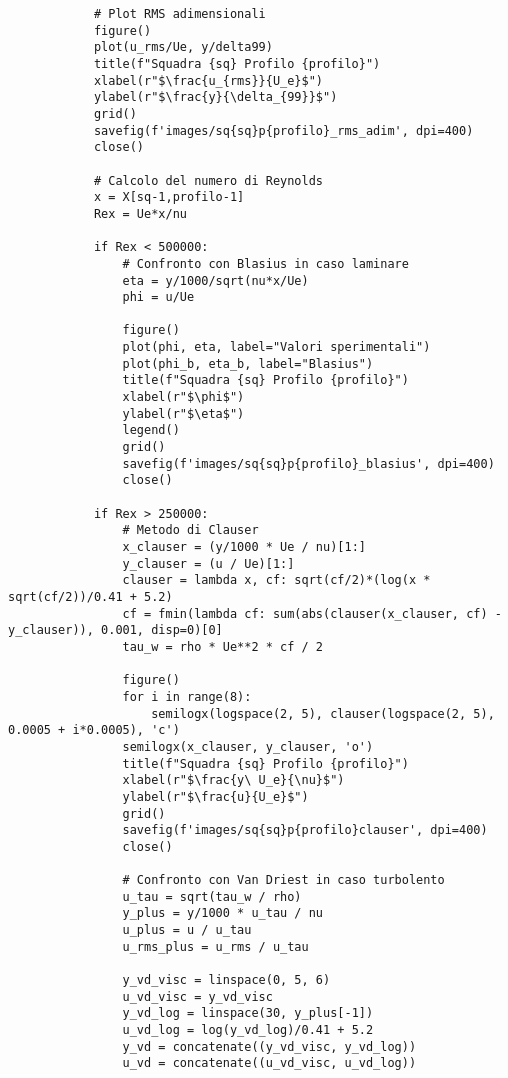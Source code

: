 \begin{lstlisting}
            # Plot RMS adimensionali
            figure()
            plot(u_rms/Ue, y/delta99)
            title(f"Squadra {sq} Profilo {profilo}")
            xlabel(r"$\frac{u_{rms}}{U_e}$")
            ylabel(r"$\frac{y}{\delta_{99}}$")
            grid()
            savefig(f'images/sq{sq}p{profilo}_rms_adim', dpi=400)
            close()

            # Calcolo del numero di Reynolds
            x = X[sq-1,profilo-1]
            Rex = Ue*x/nu

            if Rex < 500000:
                # Confronto con Blasius in caso laminare
                eta = y/1000/sqrt(nu*x/Ue)
                phi = u/Ue

                figure()
                plot(phi, eta, label="Valori sperimentali")
                plot(phi_b, eta_b, label="Blasius")
                title(f"Squadra {sq} Profilo {profilo}")
                xlabel(r"$\phi$")
                ylabel(r"$\eta$")
                legend()
                grid()
                savefig(f'images/sq{sq}p{profilo}_blasius', dpi=400)
                close()

            if Rex > 250000: 
                # Metodo di Clauser
                x_clauser = (y/1000 * Ue / nu)[1:]
                y_clauser = (u / Ue)[1:]
                clauser = lambda x, cf: sqrt(cf/2)*(log(x * sqrt(cf/2))/0.41 + 5.2)
                cf = fmin(lambda cf: sum(abs(clauser(x_clauser, cf) - y_clauser)), 0.001, disp=0)[0]
                tau_w = rho * Ue**2 * cf / 2

                figure()
                for i in range(8):
                    semilogx(logspace(2, 5), clauser(logspace(2, 5), 0.0005 + i*0.0005), 'c')
                semilogx(x_clauser, y_clauser, 'o')
                title(f"Squadra {sq} Profilo {profilo}")
                xlabel(r"$\frac{y\ U_e}{\nu}$")
                ylabel(r"$\frac{u}{U_e}$")
                grid()
                savefig(f'images/sq{sq}p{profilo}clauser', dpi=400)
                close()

                # Confronto con Van Driest in caso turbolento
                u_tau = sqrt(tau_w / rho)
                y_plus = y/1000 * u_tau / nu
                u_plus = u / u_tau
                u_rms_plus = u_rms / u_tau

                y_vd_visc = linspace(0, 5, 6)
                u_vd_visc = y_vd_visc
                y_vd_log = linspace(30, y_plus[-1])
                u_vd_log = log(y_vd_log)/0.41 + 5.2
                y_vd = concatenate((y_vd_visc, y_vd_log))
                u_vd = concatenate((u_vd_visc, u_vd_log))


\end{lstlisting}
